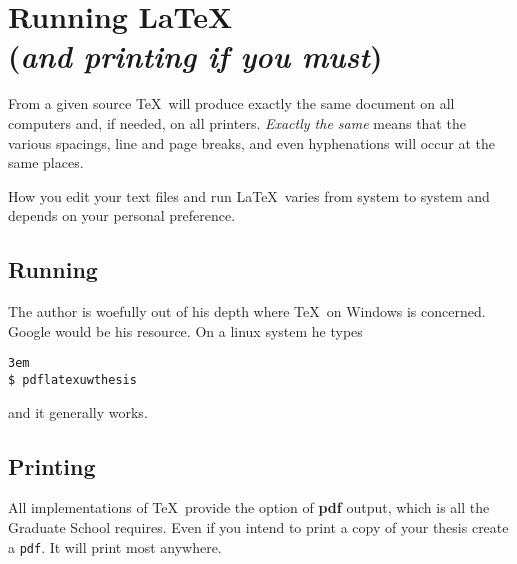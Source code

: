 \documentclass [11pt, proquest] {uwthesis}[2020/02/24]
\newenvironment{demo}
  {\begin{alltt}\leftskip3em
     \def\\{\ttfamily\char`\\}%
     \def\{{\ttfamily\char`\{}%
     \def\}{\ttfamily\char`\}}}
  {\end{alltt}}
\begin{document}




\chapter{Running \LaTeX\\
  ({\it and printing if you must})}


From a given source \TeX\ will produce exactly the same document
on all computers and, if needed, on all printers.  {\it Exactly the same}
means that the various spacings, line and page breaks, and
even hyphenations will occur at the same places.

How you edit your text files and run \LaTeX\ varies
from system to system and depends on your personal preference.

\section{Running}

The author is woefully out of his depth where
\TeX\ on Windows is concerned.  Google would be his resource.
On a linux system he types

\begin{demo}
  \$\ pdflatex uwthesis
\end{demo}

and it generally works.


\section{Printing}

All implementations of \TeX\ provide the option of {\bf pdf} output,
which is all the Graduate School requires.  Even if you intend to
print a copy of your thesis create a
  {\tt pdf}.  It will print most anywhere.
\end{document}
